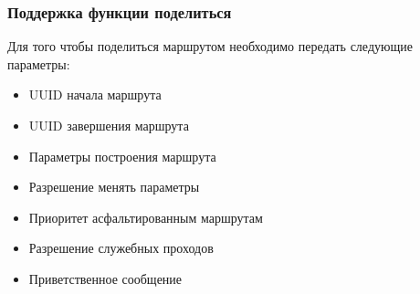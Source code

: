   \subsubsection{Поддержка функции поделиться}
    Для того чтобы поделиться маршрутом необходимо передать следующие параметры:
    \begin{itemize}
      \item UUID начала маршрута
      \item UUID завершения маршрута
      \item Параметры построения маршрута
      \item Разрешение менять параметры
      \item Приоритет асфальтированным маршрутам
      \item Разрешение служебных проходов
      \item Приветственное сообщение
    \end{itemize}

